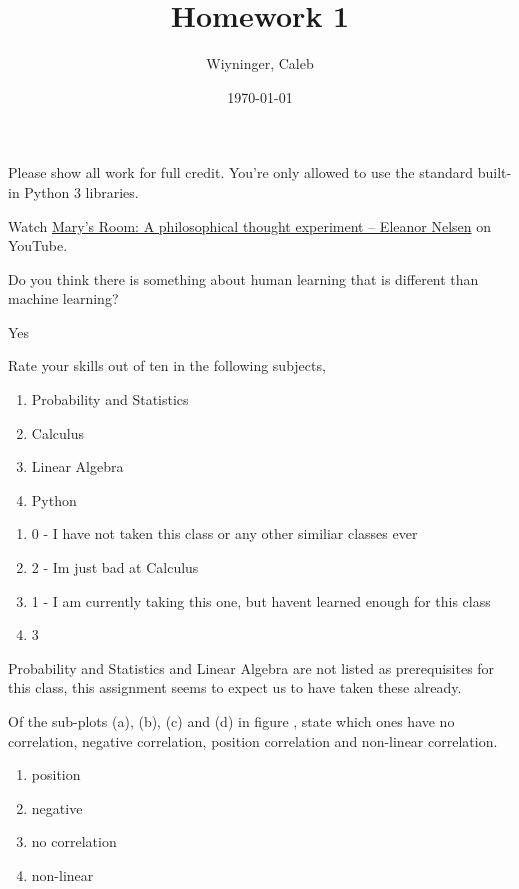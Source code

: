 \documentclass{homework}
\author{Wiyninger, Caleb}  %
\title{Homework 1}
\date{\today}  %
\begin{document}
 \maketitle

Please show all work for full credit. You're only allowed to use
the standard built-in Python 3 libraries.

\newcommand\marry{\href{%
    https://www.youtube.com/watch?v=mGYmiQkah4o%
  }{Mary's Room: A philosophical thought experiment -- Eleanor Nelsen}}

\question Watch \marry{} on YouTube.

Do you think there is something about human learning that is
different than machine learning?

\begin{sol}
  Yes
\end{sol}

\question Rate your skills out of ten in the following subjects,
\begin{enumerate}
  \item Probability and Statistics
  \item Calculus
  \item Linear Algebra
  \item Python
\end{enumerate}

\begin{sol}
  \begin{enumerate}
  \item 0 - I have not taken this class or any other similiar classes ever
  \item 2 - Im just bad at Calculus 
  \item 1 - I am currently taking this one, but havent learned enough for this class
  \item 3
  \end{enumerate}
  Probability and Statistics and Linear Algebra are not listed as prerequisites for this class, this assignment seems to expect us to have taken these already.
\end{sol}

\question Of the sub-plots (a), (b), (c) and (d) in figure %
, state
which ones have no correlation, negative correlation, position
correlation and non-linear correlation.


\begin{sol}
\begin{enumerate}[label=(\alph*)]
      \item position
      \item negative
      \item no correlation
      \item non-linear
  \end{enumerate}
\end{sol}
\end{document}
